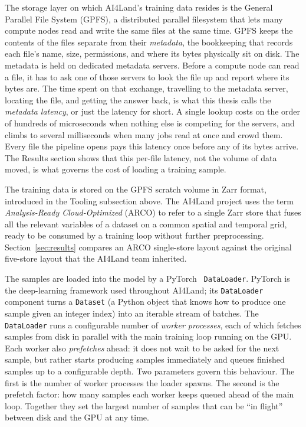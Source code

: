 \documentclass[12pt,a4paper]{article}
\begin{document}
The storage layer on which AI4Land's training data resides is the General Parallel File
System (GPFS), a distributed parallel filesystem that lets many compute nodes read and write
the same files at the same time. GPFS keeps the contents of the files separate from their
\emph{metadata}, the bookkeeping that records each file's name, size, permissions, and where
its bytes physically sit on disk. The metadata is held on dedicated metadata servers. Before a
compute node can read a file, it has to ask one of those servers to look the file up and report
where its bytes are. The time spent on that exchange, travelling to the metadata server,
locating the file, and getting the answer back, is what this thesis calls the
\emph{metadata latency}, or just the latency for short. A single lookup costs on the order of
hundreds of microseconds when nothing else is
competing for the servers, and climbs to several milliseconds when many jobs read at once and
crowd them. Every file the pipeline opens pays this latency once before any of its bytes arrive.
The Results section shows that this per-file latency, not the volume of data moved, is what
governs the cost of loading a training sample.

The training data is stored on the GPFS scratch volume in Zarr format, introduced in the
Tooling subsection above. The AI4Land project uses the term \emph{Analysis-Ready
Cloud-Optimized} (ARCO) to refer to a single Zarr store that fuses all the relevant
variables of a dataset on a common spatial and temporal grid, ready to be consumed by a
training loop without further preprocessing. Section~\ref{sec:results} compares an
ARCO single-store layout against the original five-store layout that the AI4Land team
inherited.

The samples are loaded into the model by a PyTorch~\cite{pytorch} \texttt{DataLoader}.
PyTorch is the deep-learning framework used throughout AI4Land; its \texttt{DataLoader}
component turns a \texttt{Dataset} (a Python object that knows how to produce one sample
given an integer index) into an iterable stream of batches. The \texttt{DataLoader} runs a
configurable number of \emph{worker processes}, each of which fetches samples from disk in
parallel with the main training loop running on the GPU. Each worker also \emph{prefetches}
ahead: it does not wait to be asked for the next sample, but rather starts producing samples
immediately and queues finished samples up to a configurable depth. Two parameters govern this
behaviour. The first is the number of worker processes the loader spawns. The second is the
prefetch factor: how many samples each worker keeps queued ahead of the main loop. Together
they set the largest number of samples that can be ``in flight'' between disk and the GPU at
any time.
\end{document}
